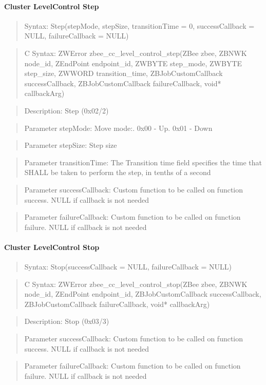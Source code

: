 \paragraph{Cluster LevelControl Step}
\begin{quote}Syntax: Step(stepMode, stepSize, transitionTime = 0, successCallback = NULL, failureCallback = NULL)\end{quote}
\begin{quote}C Syntax: ZWError zbee\_cc\_level\_control\_step(ZBee zbee, ZBNWK node\_id, ZEndPoint endpoint\_id, ZWBYTE step\_mode, ZWBYTE step\_size, ZWWORD transition\_time, ZBJobCustomCallback successCallback, ZBJobCustomCallback failureCallback, void* callbackArg)\end{quote}
\begin{quote}Description: Step (0x02/2)\end{quote}
\begin{quote}Parameter stepMode: Move mode:. 0x00 - Up. 0x01 - Down\end{quote}
\begin{quote}Parameter stepSize: Step size\end{quote}
\begin{quote}Parameter transitionTime: The Transition time field specifies the time that SHALL be taken to perform the step, in tenths of a second\end{quote}
\begin{quote}Parameter successCallback: Custom function to be called on function success. NULL if callback is not needed\end{quote}
\begin{quote}Parameter failureCallback: Custom function to be called on function failure. NULL if callback is not needed\end{quote}


\paragraph{Cluster LevelControl Stop}
\begin{quote}Syntax: Stop(successCallback = NULL, failureCallback = NULL)\end{quote}
\begin{quote}C Syntax: ZWError zbee\_cc\_level\_control\_stop(ZBee zbee, ZBNWK node\_id, ZEndPoint endpoint\_id, ZBJobCustomCallback successCallback, ZBJobCustomCallback failureCallback, void* callbackArg)\end{quote}
\begin{quote}Description: Stop (0x03/3)\end{quote}
\begin{quote}Parameter successCallback: Custom function to be called on function success. NULL if callback is not needed\end{quote}
\begin{quote}Parameter failureCallback: Custom function to be called on function failure. NULL if callback is not needed\end{quote}


